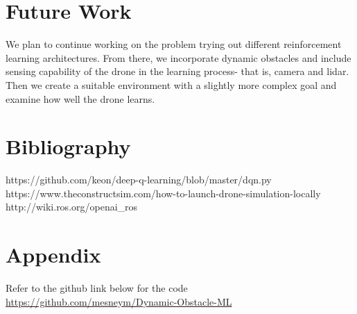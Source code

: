 \documentclass[12pt]{article}
\begin{document}
\section{Future Work}
We plan to continue working on the problem trying out different reinforcement learning architectures. From there, we incorporate 
dynamic obstacles and include sensing capability of the drone in the learning process- that is, camera and lidar. Then we create a suitable
environment with a slightly more complex goal and examine how well the drone learns.
\section{Bibliography}
https://github.com/keon/deep-q-learning/blob/master/dqn.py \\
https://www.theconstructsim.com/how-to-launch-drone-simulation-locally \\
http://wiki.ros.org/openai\_ros

\section{Appendix}
Refer to the github link below for the code \\
\href{https://github.com/mesneym/Dynamic-Obstacle-ML}{https://github.com/mesneym/Dynamic-Obstacle-ML}
\end{document}
